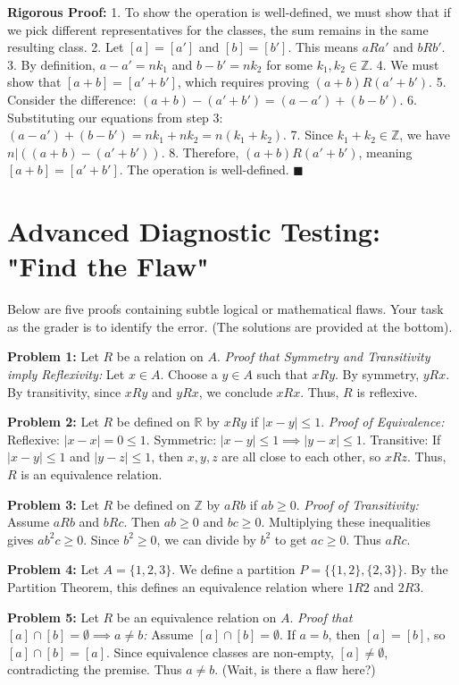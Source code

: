 \documentclass[11pt, a4paper]{article}
\theoremstyle{definition}
\theoremstyle{remark}
\newcommand{\R}{\mathbb{R}}
\newcommand{\Z}{\mathbb{Z}}
\begin{document}
\textbf{Rigorous Proof:}
1. To show the operation is well-defined, we must show that if we pick different representatives for the classes, the sum remains in the same resulting class.
2. Let $[a] = [a']$ and $[b] = [b']$. This means $a R a'$ and $b R b'$.
3. By definition, $a - a' = nk_1$ and $b - b' = nk_2$ for some $k_1, k_2 \in \Z$.
4. We must show that $[a+b] = [a'+b']$, which requires proving $(a+b) R (a'+b')$.
5. Consider the difference: $(a+b) - (a'+b') = (a - a') + (b - b')$.
6. Substituting our equations from step 3: $(a - a') + (b - b') = nk_1 + nk_2 = n(k_1 + k_2)$.
7. Since $k_1 + k_2 \in \Z$, we have $n | ((a+b) - (a'+b'))$.
8. Therefore, $(a+b) R (a'+b')$, meaning $[a+b] = [a'+b']$. The operation is well-defined. $\blacksquare$

\section{Advanced Diagnostic Testing: "Find the Flaw"}

Below are five proofs containing subtle logical or mathematical flaws. Your task as the grader is to identify the error. (The solutions are provided at the bottom).

\textbf{Problem 1:} Let $R$ be a relation on $A$. \textit{Proof that Symmetry and Transitivity imply Reflexivity:} Let $x \in A$. Choose a $y \in A$ such that $x R y$. By symmetry, $y R x$. By transitivity, since $x R y$ and $y R x$, we conclude $x R x$. Thus, $R$ is reflexive.

\textbf{Problem 2:} Let $R$ be defined on $\R$ by $x R y$ if $|x - y| \le 1$. \textit{Proof of Equivalence:} Reflexive: $|x - x| = 0 \le 1$. Symmetric: $|x - y| \le 1 \implies |y - x| \le 1$. Transitive: If $|x - y| \le 1$ and $|y - z| \le 1$, then $x, y, z$ are all close to each other, so $x R z$. Thus, $R$ is an equivalence relation.

\textbf{Problem 3:} Let $R$ be defined on $\Z$ by $a R b$ if $ab \ge 0$. \textit{Proof of Transitivity:} Assume $a R b$ and $b R c$. Then $ab \ge 0$ and $bc \ge 0$. Multiplying these inequalities gives $ab^2c \ge 0$. Since $b^2 \ge 0$, we can divide by $b^2$ to get $ac \ge 0$. Thus $a R c$.

\textbf{Problem 4:} Let $A = \{1, 2, 3\}$. We define a partition $P = \{\{1, 2\}, \{2, 3\}\}$. By the Partition Theorem, this defines an equivalence relation where $1 R 2$ and $2 R 3$.

\textbf{Problem 5:} Let $R$ be an equivalence relation on $A$. \textit{Proof that $[a] \cap [b] = \emptyset \implies a \neq b$:} Assume $[a] \cap [b] = \emptyset$. If $a = b$, then $[a] = [b]$, so $[a] \cap [b] = [a]$. Since equivalence classes are non-empty, $[a] \neq \emptyset$, contradicting the premise. Thus $a \neq b$. (Wait, is there a flaw here?)
\end{document}
